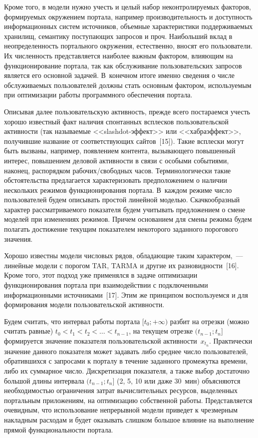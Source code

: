 \begin{multicols}{2}
  Кроме того, в модели нужно учесть и целый набор неконтролируемых факторов, 
формируемых окружением портала, например производительность и доступность 
информационных сис\-тем источников, объемные характеристики под\-дер\-жи\-ва\-емых 
хранилищ, семантику поступающих запросов и проч. Наибольший вклад в неопределенность 
портального окружения, естественно, вносят его пользователи. Их численность 
представляется наиболее важным фактором, влияющим на функционирование портала, так 
как обслуживание пользовательских запросов является его основной задачей. В~конечном 
итоге именно сведения о числе обслуживаемых пользователей должны стать основным 
фактором, используемым при оптимизации работы программного обеспечения портала.
  
  Описывая далее пользовательскую активность, прежде всего постараемся учесть хорошо 
известный факт наличия спонтанных всплесков пользовательской активности (так 
называемые <<slashdot-эф\-фект>> или <<хабраэффект>>, получившие название от 
соответствующих сайтов~[15]). Такие всплески могут быть вызваны, например, появлением 
контента, вызывающего повышенный интерес, повышением деловой активности в связи с 
особыми событиями, наконец, распорядком рабочих/свободных часов. Терминологически 
такие обстоятельства предлагается характеризовать предположением о наличии нескольких 
режимов функционирования портала. В~каждом режиме число пользователей будем 
описывать простой линейной моделью. Скачкообразный характер рассматриваемого 
показателя будем учитывать предложением о смене моделей при изменениях режимов. 
Причем основанием для смены режима будем полагать достижение текущим показателем 
некоторого заданного порогового значения.
  
  Хорошо известны модели числовых рядов, обладающие таким характером,~--- линейные 
модели с порогом TAR, TARMA и другие их раз\-но\-вид\-ности~[16]. Кроме того, этот подход 
уже применялся в задаче оптимизации функционирования портала при взаимодействии с 
подключенными информационными источниками~[17]. Этим же принципом воспользуемся 
и для формирования модели пользовательской активности.
  
  Будем считать, что интервал работы портала $[t_0;+\infty)$ разбит на отрезки (можно 
считать равные) $t_0<t_1<t_2<\ldots < t_{n-1}$, на текущем отрезке $(t_{n-1};t_n]$ 
формируется значение показателя пользовательской активности~$x_{t_n}$. Практически 
значение данного показателя может задавать либо среднее число пользователей, 
обратившихся с запросами к порталу в течение заданного промежутка времени, либо их 
суммарное число. Дискретизация показателя, а также выбор достаточно большой длины 
интервала $(t_{n-1};t_n]$ (2, 5, 10 или даже 30~мин) объясняются необходимостью 
ограничения затрат вычислительных ресурсов, выделенных портальным приложениям, на 
оптимизацию собственной работы. Представляется очевидным, что использование 
непрерывной модели приведет к чрезмерным накладным расходам и будет оказывать 
слишком большое влияние на выполнение прямой функциональности портала.
  

\end{multicols}
